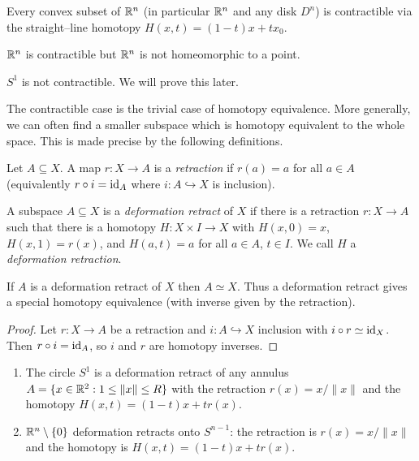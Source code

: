 \begin{example}
Every convex subset of $\mathbb{R}^n$ (in particular $\mathbb{R}^n$ and any disk $D^n$) is contractible via the straight--line homotopy $H(x,t)=(1-t)x+t x_0$.
\end{example}





\begin{example}
  $\mathbb{R}^n$ is contractible but $\mathbb{R}^n$ is not homeomorphic to a point.
\end{example}

\begin{example}
  $S^1$ is not contractible. We will prove this later.
\end{example}

The contractible case is the trivial case of homotopy equivalence. More generally, we can often find a smaller subspace which is homotopy equivalent to the whole space. This is made precise by the following definitions.


\begin{definition}
Let $A\subseteq X$. A map $r\colon X\to A$ is a \emph{retraction} if $r(a)=a$ for all $a\in A$ (equivalently $r\circ i=\text{id}_A$ where $i\colon A\hookrightarrow X$ is inclusion).
\end{definition}

\begin{definition}
A subspace $A\subseteq X$ is a \emph{deformation retract} of $X$ if there is a retraction $r\colon X\to A$ such that there is a homotopy $H\colon X\times I\to X$ with $H(x,0)=x$, $H(x,1)=r(x)$, and $H(a,t)=a$ for all $a\in A$, $t\in I$. We call $H$ a \emph{deformation retraction}.
\end{definition}

\begin{proposition}
If $A$ is a deformation retract of $X$ then $A\simeq X$. Thus a deformation retract gives a special homotopy equivalence (with inverse given by the retraction).
\end{proposition}

\begin{proof}
Let $r\colon X\to A$ be a retraction and $i\colon A\hookrightarrow X$ inclusion with $i\circ r\simeq \text{id}_X$. Then $r\circ i=\text{id}_A$, so $i$ and $r$ are homotopy inverses.
\end{proof}

\begin{example}
  \begin{enumerate}
    \item The circle $S^1$ is a deformation retract of any annulus $A=\{x\in \mathbb{R}^2 : 1\le \lVert x\rVert \le R\}$ with the retraction $r(x)=x/\lVert x\rVert$ and the homotopy $H(x,t)=(1-t)x+t r(x)$.
    \item $\mathbb{R}^n\setminus\{0\}$ deformation retracts onto $S^{n-1}$: the retraction is $r(x)=x/\lVert x\rVert$ and the homotopy is $H(x,t)=(1-t)x+t r(x)$.
  \end{enumerate}
\end{example}

